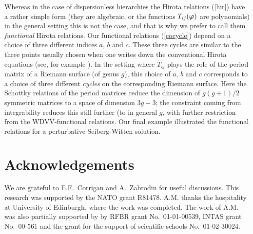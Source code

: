 \documentclass[a4paper,]{article}
\def\Bf#1{\mbox{\boldmath $#1$}}
\begin{document}
Whereas in the case of dispersionless hierarchies the Hirota relations
(\ref{hir}) have a rather simple form (they are algebraic, or the 
functions $T_{ij}(\Bf\varphi)$ are polynomials) in the general setting
this is not the case,
and that is why we prefer to call them {\em functional} Hirota relations.
Our functional relations (\ref{cocycle}) depend on a choice of
three different indices $a$, $b$ and $c$.
These three cycles are similar to the three points usually chosen when
one writes down the conventional Hirota equations 
(see, for example \cite{ZaHi}).
In the setting where $T_{ij}$ plays the role of the period matrix of
a Riemann surface (of genus $g$), this choice of $a$, $b$ and $c$
corresponds to a choice of three different {\em cycles} on the corresponding 
Riemann surface. Here the Schottky relations of the period matrices 
reduce the dimension of $g(g+1)/2$ symmetric matrices to a space of
dimension $3g-3$; the constraint coming from integrability reduces this
still further (to in general $g$, with further restriction from the
WDVV-functional relations.
Our final example illustrated the functional relations for a 
perturbative Seiberg-Witten solution.

\section*{Acknowledgements}

We are grateful to E.F.~Corrigan and A.~Zabrodin for useful discussions.
This research was supported by the NATO grant R81478. A.M. thanks the
hospitality at University of Edinburgh, where the work was completed.
The work of A.M. was also partially supported by by RFBR grant
No.~01-01-00539, INTAS grant No.~00-561
and the grant for the support of scientific schools
No.~01-02-30024.
\end{document}
